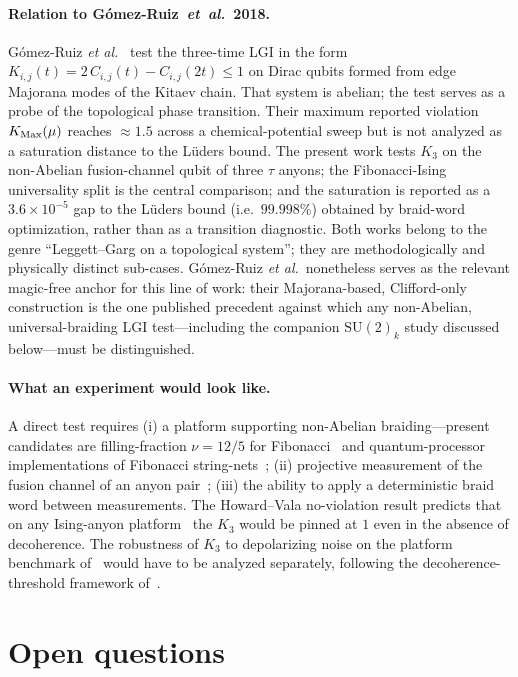 \documentclass[aps,prx,reprint,amsmath,amssymb,floatfix,nofootinbib,superscriptaddress]{revtex4-2}
\begin{document}
\paragraph{Relation to G\'omez-Ruiz~\textit{et~al.}~2018.}
G\'omez-Ruiz \emph{et al.}~\cite{GomezRuiz2018} test the three-time
LGI in the form $K_{i,j}(t) = 2\,C_{i,j}(t) - C_{i,j}(2t) \leq 1$ on
Dirac qubits formed from edge Majorana modes of the Kitaev chain.
That system is abelian; the test serves as a probe of the topological
phase transition. Their maximum reported violation $K_{\rm Max}(\mu)$
reaches $\approx 1.5$ across a chemical-potential sweep but is not
analyzed as a saturation distance to the L\"uders bound. The present
work tests $K_{3}$ on the non-Abelian fusion-channel qubit of three
$\tau$ anyons; the Fibonacci-Ising universality split is the central
comparison; and the saturation is reported as a $3.6 \times 10^{-5}$
gap to the L\"uders bound (i.e.\ $99.998\%$) obtained by braid-word
optimization, rather than as a transition diagnostic. Both works
belong to the genre ``Leggett--Garg on a topological system''; they
are methodologically and physically distinct sub-cases.
G\'omez-Ruiz \emph{et al.}\ nonetheless serves as the relevant
magic-free anchor for this line of work: their Majorana-based,
Clifford-only construction is the one published precedent against
which any non-Abelian, universal-braiding LGI test---including the
companion $\mathrm{SU}(2)_k$ study discussed below---must be
distinguished.

\paragraph{What an experiment would look like.}
A direct test requires (i) a platform supporting non-Abelian
braiding---present candidates are filling-fraction $\nu = 12/5$ for
Fibonacci~\cite{NayakSimonStern2008} and quantum-processor
implementations of Fibonacci string-nets~\cite{Xu2024,Minev2025};
(ii) projective measurement of the fusion channel of an anyon
pair~\cite{Bonderson2008}; (iii) the ability to apply a deterministic
braid word between measurements. The Howard--Vala no-violation result
predicts that on any Ising-anyon platform~\cite{Andersen2023,Iqbal2024} the
$K_{3}$ would be pinned at $1$ even in the absence of decoherence.
The robustness of $K_{3}$ to depolarizing noise on the platform
benchmark of~\cite{Andersen2023} would have to be analyzed
separately, following the decoherence-threshold framework
of~\cite{Emary2013}.

\section{Open questions}
\label{sec:open}
\end{document}
